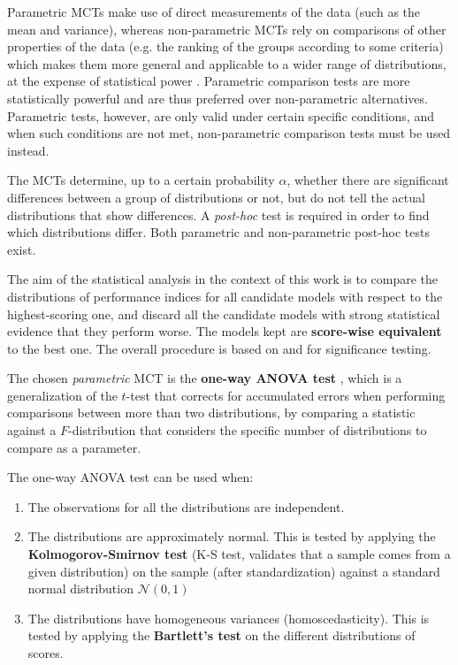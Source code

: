 Parametric MCTs make use of direct measurements of the data (such as the mean and variance), whereas
non-parametric MCTs rely on comparisons of other properties of the data (e.g. the ranking of the
groups according to some criteria) which makes them more general and applicable to a wider range of
distributions, at the expense of statistical power \cite{sheskin2003statistics}. Parametric
comparison tests are more statistically powerful and are thus preferred over non-parametric
alternatives.  Parametric tests, however, are only valid under certain specific conditions, and when
such conditions are not met, non-parametric comparison tests must be used instead.

The MCTs determine, up to a certain probability $\alpha$, whether there are significant differences between a
group of distributions or not, but do not tell the actual distributions that show differences. A
\emph{post-hoc} test is required in order to find which distributions differ. Both parametric and
non-parametric post-hoc tests exist.

The aim of the statistical analysis in the context of this work is to compare the distributions of
performance indices for all candidate models with respect to the highest-scoring one, and discard
all the candidate models with strong statistical evidence that they perform worse. The models kept
are {\bf score-wise equivalent} to the best one. The overall procedure is based on
\cite{pizarro2002mct} and \cite{demsar2006mct} for significance testing.

The chosen \emph{parametric} MCT is the {\bf one-way ANOVA test} \cite{fisher1925statistical}, which is a
generalization of the $t$-test that corrects for accumulated errors when performing comparisons
between more than two distributions, by comparing a statistic against a $F$-distribution that
considers the specific number of distributions to compare as a parameter.

The one-way ANOVA test can be used when:
\begin{enumerate}
	\item The observations for all the distributions are independent.
	\item The distributions are approximately normal. This is tested by applying the
	{\bf Kolmogorov-Smirnov test} (K-S test, validates that a sample comes from a given distribution) on
	the sample (after standardization) against a standard normal distribution $\mathcal{N}(0,1)$
	\item The distributions have homogeneous variances (homoscedasticity). This is tested by
	applying the {\bf Bartlett's test} \cite{bartlett1937} on the different distributions of scores.
\end{enumerate}

